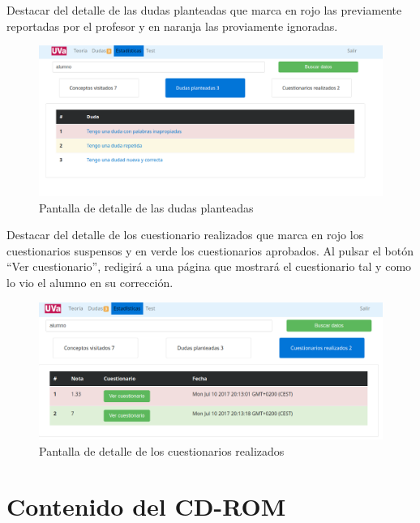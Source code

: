 \documentclass[openright,twoside,10pt]{book}
\begin{document}
    Destacar del detalle de las dudas planteadas que marca en rojo las
    previamente reportadas por el profesor y en naranja las proviamente
    ignoradas.
    
    \begin{figure}[H]
        \begin{center}
            \includegraphics[width=\textwidth]{img/manual/profesor-estadisticas-detalle2.png}
        \end{center}
        \caption{Pantalla de detalle de las dudas planteadas}
    \end{figure}
    
    Destacar del detalle de los cuestionario realizados que marca en rojo
    los cuestionarios suspensos y en verde los cuestionarios aprobados. Al
    pulsar el botón \enquote{Ver cuestionario}, redigirá a una página que
    mostrará el cuestionario tal y como lo vio el alumno en su corrección.
    
    \begin{figure}[H]
        \begin{center}
            \includegraphics[width=\textwidth]{img/manual/profesor-estadisticas-detalle3.png}
        \end{center}
        \caption{Pantalla de detalle de los cuestionarios realizados}
    \end{figure}
    
    \chapter{Contenido del CD-ROM}\label{contenido-del-cd-rom}
    
\end{document}
